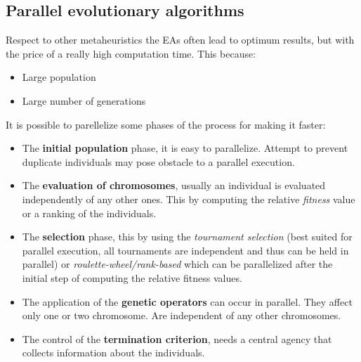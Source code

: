 \documentclass{article}
\begin{document}
\subsection{Parallel evolutionary algorithms}
Respect to other metaheuristics the EAs often lead to optimum results, but with the price of a
really high computation time.
This because:
\begin{itemize}
    \item Large population
    \item Large number of generations
\end{itemize}
It is possible to parellelize some phases of the process for making it faster:
\begin{itemize}
    \item The \textbf{initial population} phase, it is easy to parallelize. Attempt to prevent
          duplicate individuals may pose obstacle to a parallel execution.

    \item The \textbf{evaluation of chromosomes}, usually an individual is evaluated
          independently of any other ones. This by computing the relative \textit{fitness} value
          or a ranking of the individuals.
    \item The \textbf{selection} phase, this by using the \textit{tournament selection} (best
          suited for parallel execution, all tournaments are independent and thus can be held in parallel) or
          \textit{roulette-wheel/rank-based} which can be parallelized after the initial step of computing
          the relative fitness values.

    \item The application of the \textbf{genetic operators} can occur in parallel. They affect only
          one or two chromosome. Are independent of any other chromosomes.
    \item The control of the \textbf{termination criterion}, needs a central agency that collects information
          about the individuals.
\end{itemize}
\end{document}
